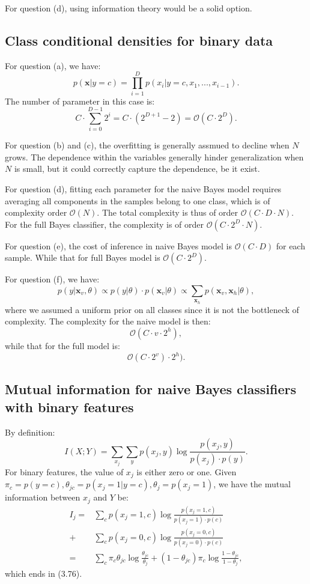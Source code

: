 \documentclass[UTF8]{ctexart}
\begin{document}
For question (d), using information theory would be a solid option. 

\subsection{Class conditional densities for binary data}
For question (a), we have:
$$p(\textbf{x}|y=c)=\prod_{i=1}^{D}p(x_{i}|y=c,x_{1},...,x_{i-1}).$$
The number of parameter in this case is:
$$C\cdot \sum_{i=0}^{D-1}2^{i}=C\cdot(2^{D+1}-2) = \mathcal{O}(C\cdot 2^{D}).$$

For question (b) and (c), the overfitting is generally assmued to decline when $N$ grows. 
The dependence within the variables generally hinder generalization when $N$ is small, but it could correctly capture the dependence, be it exist.

For question (d), fitting each parameter for the naive Bayes model requires averaging all components in the samples belong to one class, which is of complexity order $\mathcal{O}(N)$. The total complexity is thus of order $\mathcal{O}(C\cdot D\cdot N)$.
For the full Bayes classifier, the complexity is of order $\mathcal{O}(C\cdot 2^{D}\cdot N)$.

For question (e), the cost of inference in naive Bayes model is $\mathcal{O}(C\cdot D)$ for each sample. 
While that for full Bayes model is $\mathcal{O}(C\cdot 2^{D})$.

For question (f), we have:
$$p(y|\textbf{x}_{v},\theta)\propto p(y|\theta)\cdot p(\textbf{x}_{v}|\theta)\propto\sum_{\textbf{x}_{h}}p(\textbf{x}_{v},\textbf{x}_{h}|\theta),$$
where we assumed a uniform prior on all classes since it is not the bottleneck of complexity. 
The complexity for the naive model is then:
$$\mathcal{O}(C\cdot v\cdot 2^{h}),$$
while that for the full model is:
$$\mathcal{O}(C\cdot 2^{v})\cdot 2^{h}).$$


\subsection{Mutual information for naive Bayes classifiers with binary features}
By definition:
$$I(X;Y)=\sum_{x_{j}}\sum_{y}p(x_{j},y)\log \frac{p(x_{j},y)}{p(x_{j})\cdot p(y)}.$$
For binary features, the value of $x_{j}$ is either zero or one.
Given $\pi_{c}=p(y=c),\theta_{jc}=p(x_{j}=1|y=c),\theta_{j}=p(x_{j}=1)$, we have the mutual information between $x_{j}$ and $Y$ be:
\begin{align}
I_{j}=&\sum_{c}p(x_{j}=1,c)\log \frac{p(x_{j}=1,c)}{p(x_{j}=1)\cdot p(c)}\nonumber \\
 +& \sum_{c}p(x_{j}=0,c)\log \frac{p(x_{j}=0,c)}{p(x_{j}=0)\cdot p(c)} \nonumber \\
=&\sum_{c}\pi_{c}\theta_{jc} \log \frac{\theta_{jc}}{\theta_{j}} + (1-\theta_{jc})\pi_{c} \log \frac{1-\theta_{jc}}{1-\theta_{j}},\nonumber 
\end{align}
which ends in (3.76).
\end{document}
